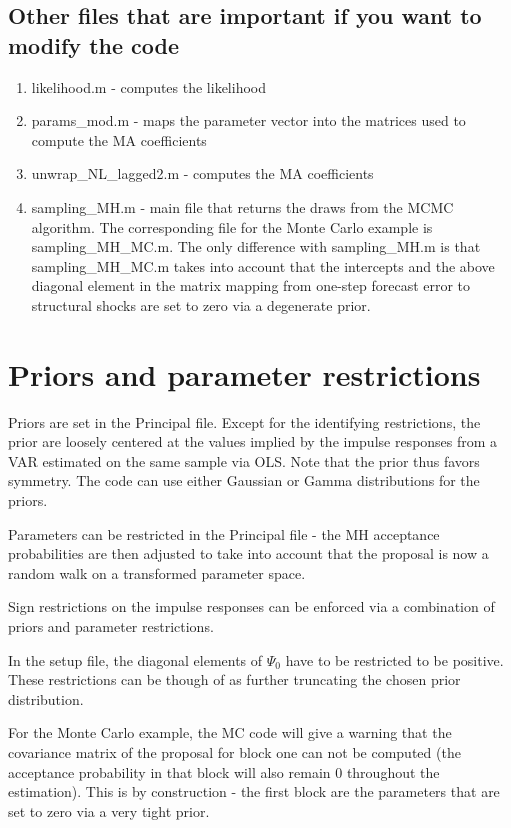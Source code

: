 \documentclass[a4paper,12pt]{article}
\begin{document}
\subsection{Other files that are important if you want to modify the code}
\begin{enumerate}
\item likelihood.m - computes the likelihood
\item params\_mod.m - maps the parameter vector into the matrices used to compute the MA coefficients
\item unwrap\_NL\_lagged2.m - computes the MA coefficients
\item sampling\_MH.m - main file that returns the draws from the MCMC algorithm. The corresponding file for the Monte Carlo example is sampling\_MH\_MC.m. The only difference with sampling\_MH.m is that sampling\_MH\_MC.m takes into account that the intercepts and the above diagonal element in the matrix mapping from one-step forecast error to structural shocks are set to zero via a degenerate prior.
\end{enumerate}


\section{Priors and parameter restrictions} 
Priors are set in the Principal file. Except for the identifying restrictions, the prior are loosely centered at the values implied by the impulse responses from a VAR estimated on the same sample via OLS. Note that the prior thus favors symmetry. The code can use either Gaussian or Gamma distributions for the priors. 

Parameters can be restricted in the Principal file - the MH acceptance probabilities are then adjusted to take into account that the proposal is now a random walk on a transformed parameter space. 

Sign restrictions on the impulse responses can be enforced via a combination of priors and parameter restrictions. 

In the setup file, the diagonal elements of $\Psi_0$ have to be restricted to be positive. These restrictions can be though of as further truncating the chosen prior distribution. 

For the Monte Carlo example, the MC code will give a warning that the covariance matrix of the proposal for block one can not be computed (the acceptance probability in that block will also remain 0 throughout the estimation). This is by construction - the first block are the parameters that are set to zero via a very tight prior.
\end{document}
